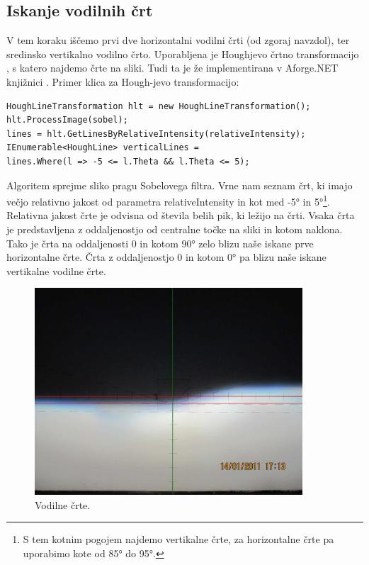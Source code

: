 \documentclass[oneside, a4paper, 12pt]{book}
\begin{document}
\subsection{Iskanje vodilnih črt}
V tem koraku iščemo prvi dve horizontalni vodilni črti (od zgoraj navzdol), ter sredinsko vertikalno vodilno črto. Uporabljena je Houghjevo črtno transformacijo \cite{hough-wiki}, s katero najdemo črte na sliki. Tudi ta je že implementirana v Aforge.NET knjižnici \cite{hough}. Primer klica za Hough-jevo transformacijo:
\begin{samepage}
\begin{verbatim}
HoughLineTransformation hlt = new HoughLineTransformation();
hlt.ProcessImage(sobel);
lines = hlt.GetLinesByRelativeIntensity(relativeIntensity);
IEnumerable<HoughLine> verticalLines = 
lines.Where(l => -5 <= l.Theta && l.Theta <= 5);
\end{verbatim}
\end{samepage}
Algoritem sprejme sliko pragu Sobelovega filtra. Vrne nam seznam črt, ki imajo večjo relativno jakost od parametra relativeIntensity in kot med -5° in 5°\footnote{S tem kotnim pogojem najdemo vertikalne črte, za horizontalne črte pa uporabimo kote od 85° do 95°.}. Relativna jakost črte je odvisna od števila belih pik, ki ležijo na črti. Vsaka črta je predstavljena z oddaljenostjo od centralne točke na sliki in kotom naklona. Tako je črta na oddaljenosti 0 in kotom 90° zelo blizu naše iskane prve horizontalne črte. Črta z oddaljenostjo 0 in kotom 0° pa blizu naše iskane vertikalne vodilne črte. \cite{hough} 

\begin{figure}
\begin{center}
\includegraphics[width=10cm]{slike/vodilne-crte.jpg}
\end{center}
\caption{Vodilne črte.}
\label{pic:vodilne-crte}
\end{figure}
\end{document}
